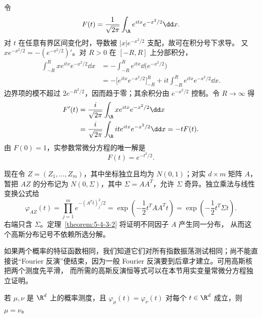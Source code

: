 \begin{example}[高斯特征函数]\label{ex:5-4-3-1}
令
\[
 F(t)=\frac1{\sqrt{2\pi}}\int_{\R}e^{itx}e^{-x^2/2}\dd x.
\]
对 $t$ 在任意有界区间变化时，导数被 $|x|e^{-x^2/2}$ 支配，故可在积分号下求导。
又 $xe^{-x^2/2}=-(e^{-x^2/2})'$。对 $R>0$ 在 $[-R,R]$ 上分部积分，
\begin{align*}
 \int_{-R}^{R}xe^{itx}e^{-x^2/2}\dd x
 &=-\int_{-R}^{R}e^{itx}\dd\bigl(e^{-x^2/2}\bigr)\\
 &=-\bigl[e^{itx}e^{-x^2/2}\bigr]_{-R}^{R}
   +it\int_{-R}^{R}e^{itx}e^{-x^2/2}\dd x.
\end{align*}
边界项的模不超过 $2e^{-R^2/2}$，因而趋于零；其余积分由
$e^{-x^2/2}$ 控制。令 $R\to\infty$ 得
\begin{align*}
 F'(t)
 &=\frac{i}{\sqrt{2\pi}}\int_{\R}xe^{itx}e^{-x^2/2}\dd x\\
 &=\frac{i}{\sqrt{2\pi}}\int_{\R}it e^{itx}e^{-x^2/2}\dd x
 =-tF(t).
\end{align*}
由 $F(0)=1$，实参数常微分方程的唯一解是
\[
 F(t)=e^{-t^2/2}.
\]

现在令 $Z=(Z_1,\dots,Z_m)$，其中坐标独立且均为 $N(0,1)$；对实
$d\times m$ 矩阵 $A$，暂把 $AZ$ 的分布记为 $N(0,\Sigma)$，其中
$\Sigma=AA^T$，允许 $\Sigma$ 奇异。独立乘法与线性变换公式给
\[
 \varphi_{AZ}(t)
 =\prod_{j=1}^m e^{-(A^Tt)_j^2/2}
 =\exp\left(-\frac12t^TAA^Tt\right)
 =\exp\left(-\frac12t^T\Sigma t\right).
\]
右端只含 $\Sigma$。定理~\ref{theorem:5-4-3-2} 将证明不同因子 $A$ 产生同一分布，
从而这个高斯分布记号不依赖所选分解。
\end{example}

如果两个概率的特征函数相同，我们知道它们对所有指数振荡测试相同；尚不能直接说“Fourier
反演”便结束，因为一般 Fourier 反演要到后章才建立。可用高斯核把两个测度先平滑，
而所需的高斯反演恒等式可以在本节用实变量常微分方程独立证明。

\begin{theorem}[特征函数唯一性定理]\label{theorem:5-4-3-2}
若 $\mu,\nu$ 是 $\R^d$ 上的概率测度，且
$\varphi_\mu(t)=\varphi_\nu(t)$ 对每个 $t\in\R^d$ 成立，则 $\mu=\nu$。
\end{theorem}


